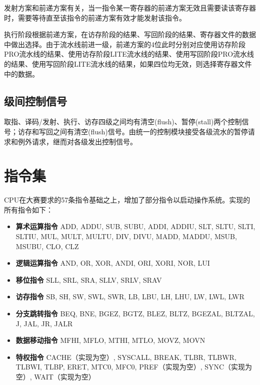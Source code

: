 发射方案和前递方案有关，当一指令某一寄存器的前递方案无效且需要读该寄存器时，需要等待直至该指令的前递方案有效才能发射该指令。

执行阶段根据前递方案，在访存阶段的结果、写回阶段的结果、寄存器文件的数据中做出选择。由于流水线前进一级，前递方案的4位此时分别对应使用访存阶段PRO流水线的结果、使用访存阶段LITE流水线的结果、使用写回阶段PRO流水线的结果、使用写回阶段LITE流水线的结果，如果四位均无效，则选择寄存器文件中的数据。

\subsection{级间控制信号}
取指、译码/发射、执行、访存四级之间均有清空(flush)、暂停(stall)两个控制信号；访存和写回之间有清空(flush)信号。由统一的控制模块接受各级流水的暂停请求和例外请求，继而对各级发出控制信号。

\section{指令集}
CPU在大赛要求的57条指令基础之上，增加了部分指令以启动操作系统。实现的所有指令如下：
\begin{itemize}
	\item \textbf{算术运算指令} ADD, ADDU, SUB, SUBU, ADDI, ADDIU, SLT, SLTU, SLTI, SLTIU, MUL, MULT, MULTU, DIV, DIVU, MADD, MADDU, MSUB, MSUBU, CLO, CLZ
	\item \textbf{逻辑运算指令} AND, OR, XOR, ANDI, ORI, XORI, NOR, LUI
	\item \textbf{移位指令} SLL, SRL, SRA, SLLV, SRLV, SRAV
	\item \textbf{访存指令} SB, SH, SW, SWL, SWR, LB, LBU, LH, LHU, LW, LWL, LWR
	\item \textbf{分支跳转指令} BEQ, BNE, BGEZ, BGTZ, BLEZ, BLTZ, BGEZAL, BLTZAL, J, JAL, JR, JALR
	\item \textbf{数据移动指令} MFHI, MFLO, MTHI, MTLO, MOVZ, MOVN
	\item \textbf{特权指令} CACHE（实现为空）, SYSCALL, BREAK, TLBR, TLBWR, TLBWI, TLBP, ERET, MTC0, MFC0, PREF（实现为空）, SYNC（实现为空）, WAIT（实现为空）
\end{itemize}

